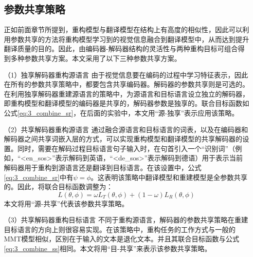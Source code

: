 \subsection{参数共享策略}
\label{sec:3_parameter_sharing}
正如前面章节所提到，重构模型与翻译模型在结构上有高度的相似性，因此可以利用参数共享的方法将重构模型学习到的视觉信息融合到翻译模型中，从而达到提升翻译质量的目的。因此，由编码器-解码器结构的灵活性与两种重构目标可组合得到多种参数共享方案。本文采用了以下三种参数共享方案。

（1）{\sffamily 独享解码器重构源语言}
由于视觉信息要在编码的过程中学习特征表示，因此在所有的参数共享策略中，都要包含共享编码器。解码器的参数共享则是可选的。在利用独享解码器重建源语言的策略中，为源语言和目标语言设立独立的解码器，即重构模型和翻译模型的编码器是共享的，解码器参数是独享的。联合目标函数如公式\ref{eq:3_combine_sr}，在后面的实验中，本文用“源-独享”表示应用该策略。

（2）{\sffamily 共享解码器重构源语言}
通过融合源语言和目标语言的词表，以及在编码器和解码器之间共享词嵌入层的方式，可以实现重构模型和翻译模型的共享解码器的设置。同时，需要在解码过程目标语言句子输入时，在句首引入一个“识别词”（例如，“<en\_sos>”表示解码到英语，“<de\_sos>”表示解码到德语）用于表示当前解码器用于重构到源语言还是翻译到目标语言。在该设置中，公式\ref{eq:3_combine_sr}中有$\psi=\phi$。这表明该策略中翻译模型和重建模型是全参数共享的。因此，将联合目标函数调整为：
\begin{equation}
    L(\theta, \phi)=\omega L_T(\theta, \phi) + (1-\omega)L_R(\theta, \phi)
    \label{eq:3_combine_ss}
\end{equation}
本文将用“源-共享”代表该参数共享策略。

（3）{\sffamily 共享解码器重构目标语言}
不同于重构源语言，解码器的参数共享策略在重建目标语言的方向上则很容易实现。在该策略中，重构任务的工作方式与一般的MMT模型相似，区别在于输入的文本是退化文本。并且其联合目标函数与公式\ref{eq:3_combine_ss}相同。本文将用“目-共享”来表示该参数共享策略。